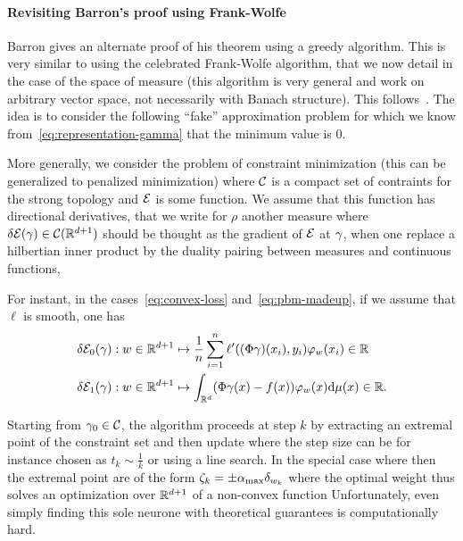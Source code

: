 \paragraph{Revisiting Barron's proof using Frank-Wolfe}

Barron gives an alternate proof of his theorem using a greedy algorithm. This is very similar to using the celebrated Frank-Wolfe algorithm, that we now detail in the case of the space of measure (this algorithm is very general and work on arbitrary vector space, not necessarily with Banach structure). This follows~\cite{bach2017breaking}.
%
The idea is to consider the following ``fake'' approximation problem
for which we know from~\eqref{eq:representation-gamma} that the minimum value is $0$.

%
More generally, we consider the problem of constraint minimization (this can be generalized to penalized minimization)
\eq{
	\uinf{ \ga \in \Cc } \Ee(\ga)
}
where $\mathcal{C}$ is a compact set of contraints for the strong topology and $\mathcal{E}$ is some function. We assume that this function has directional derivatives, that we write for $\rho$ another measure
where $\delta \mathcal{E}(\gamma) \in \mathcal{C}(\mathbb{R}^{d+1})$ should be thought as the gradient of $\mathcal{E}$ at $\gamma$, when one replace a hilbertian inner product by the duality pairing between measures and continuous functions, 


For instant, in the cases~\eqref{eq:convex-loss} and~\eqref{eq:pbm-madeup}, if we assume that $\ell$ is smooth, one has
\begin{align}
	\delta \mathcal{E}_0(\gamma) & :
	w \in \mathbb{R}^{d+1} \mapsto  \frac{1}{n} \sum_{i=1}^n \ell'(  (\Phi \gamma)(x_i),y_i ) \varphi_w(x_i)  \in \mathbb{R} \\
	\delta \mathcal{E}_1(\gamma) & :
	w \in \mathbb{R}^{d+1} \mapsto  \int_{\mathbb{R}^d} (\Phi\gamma(x) - f(x))\varphi_w(x) \mathrm{d} \mu(x) \in \mathbb{R}. \label{eq:grad-madeup}
\end{align}

Starting from $\gamma_0 \in \mathcal{C}$, the algorithm proceeds at step $k$ by extracting an extremal point of the constraint set
and then update
where the step size can be for instance chosen as $t_k \sim \frac{1}{k}$ or using a line search.
%
In the special case where 
then the extremal point are of the form $\zeta_k = \pm \alpha_{\max} \delta_{w_k}$ where the optimal weight thus solves an optimization over $\mathbb{R}^{d+1}$ of a non-convex function
Unfortunately, even simply finding this sole neurone with theoretical guarantees is computationally hard.

